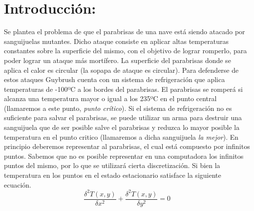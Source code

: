 \documentclass[a4paper]{article}
\begin{document}
\section{Introducción:}


Se plantea el problema de que el parabrisas de una nave está siendo atacado por sanguijuelas mutantes. Dicho ataque consiste en aplicar altas temperaturas constantes sobre la superficie del mismo, con el objetivo de lograr romperlo, para poder lograr un ataque más mortífero. La superficie del parabrisas donde se aplica el calor es circular (la sopapa de ataque es circular). \newline
Para defenderse de estos ataques Guybrush cuenta con un sistema de refrigeración que aplica temperaturas de -100ºC a los bordes del parabrisas. El parabrisas se romperá si alcanza una temperatura mayor o igual a los 235ºC en el punto central (llamaremos a este punto, \textit{punto crítico}).\newline
Si el sistema de refrigeración no es suficiente para salvar el parabrisas, se puede utilizar un arma para destruir una sanguijuela que de ser posible salve el parabrisas y reduzca lo mayor posible la temperatura en el punto critico (llamaremos a dicha sanguijuela \textit{la mejor}). 
En principio deberemos representar al parabrisas, el cual está compuesto por infinitos puntos. Sabemos que no es posible representar en una computadora los infinitos puntos del mismo, por lo que se utilizará cierta discretización.
Si bien la temperatura en los puntos en el estado estacionario satisface la siguiente ecuación.\\

\begin{equation}
\frac{\delta ^2 T(x,y)}{\delta x^2}+\frac{\delta ^2 T(x,y)}{\delta y^2}=0 
\end{equation}\\
\end{document}
